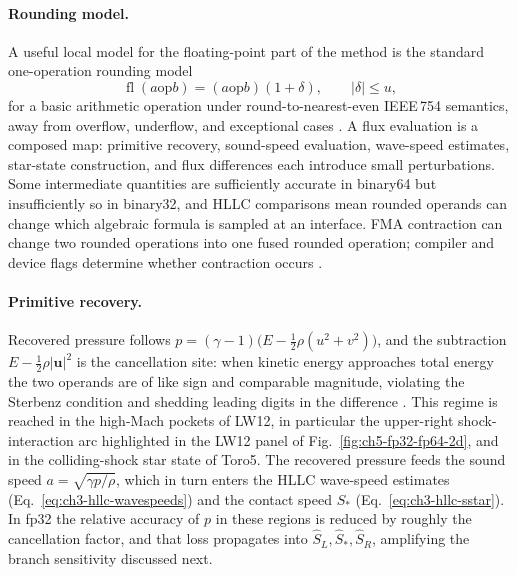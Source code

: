 \paragraph{Rounding model.}
A useful local model for the floating-point part of the method is the standard
one-operation rounding model
\begin{equation}\label{eq:ch3-rounding-model}
  \operatorname{fl}(a \mathbin{\mathrm{op}} b)
  =
  (a \mathbin{\mathrm{op}} b)(1+\delta),
  \qquad |\delta|\le u ,
\end{equation}
for a basic arithmetic operation under round-to-nearest-even IEEE\,754 semantics,
away from overflow, underflow, and exceptional cases
\citep{ieee754_2019,goldberg_1991,higham_2002}. A flux evaluation is a composed
map: primitive recovery, sound-speed evaluation, wave-speed estimates, star-state
construction, and flux differences each introduce small perturbations. Some
intermediate quantities are sufficiently accurate in binary64 but insufficiently
so in binary32, and HLLC comparisons mean rounded operands can change which
algebraic formula is sampled at an interface. FMA contraction can change two
rounded operations into one fused rounded operation; compiler and device flags
determine whether contraction occurs \citep{ieee754_2019,higham_2002}.

\paragraph{Primitive recovery.}
Recovered pressure follows
\(p = (\gamma-1)\bigl(E - \tfrac{1}{2}\rho(u^2+v^2)\bigr)\),
and the subtraction \(E - \tfrac{1}{2}\rho\lvert\mathbf{u}\rvert^{2}\) is the
cancellation site: when kinetic energy approaches total energy the two operands
are of like sign and comparable magnitude, violating the Sterbenz condition and
shedding leading digits in the difference \citep{higham_2002}. This regime is
reached in the high-Mach pockets of LW12, in particular the upper-right
shock-interaction arc highlighted in the LW12 panel of Fig.~\ref{fig:ch5-fp32-fp64-2d},
and in the colliding-shock star state of Toro5. The recovered pressure feeds
the sound speed \(a=\sqrt{\gamma p/\rho}\), which in turn enters the HLLC
wave-speed estimates (Eq.~\ref{eq:ch3-hllc-wavespeeds}) and the contact speed
\(S_\ast\) (Eq.~\ref{eq:ch3-hllc-sstar}). In fp32 the relative accuracy of \(p\)
in these regions is reduced by roughly the cancellation factor, and that loss
propagates into \(\widehat S_L,\widehat S_\ast,\widehat S_R\), amplifying the
branch sensitivity discussed next.

